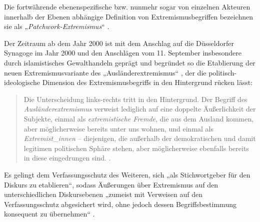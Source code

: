 Die fortwährende ebenenspezifische bzw. nunmehr sogar von einzelnen Akteuren innerhalb der Ebenen abhängige Definition von Extremismusbegriffen bezeichnen sie als „\emph{Patchwork-Extremismus}`` \autocite[191]{ackermannMetamorphosenExtremismusbegriffesDiskursanalytische2015}.

Der Zeitraum ab dem Jahr 2000 ist mit dem Anschlag auf die Düsseldorfer Synagoge im Jahr 2000 und den Anschlägen vom 11. September insbesondere durch islamistisches Gewalthandeln geprägt und begründet so die Etablierung der neuen Extremismusvariante des „Ausländerextremismus`` \autocite[210]{ackermannMetamorphosenExtremismusbegriffesDiskursanalytische2015}, der die politisch-ideologische Dimension des Extremismusbegriffs in den Hintergrund rücken lässt:

\begin{quote}
Die Unterscheidung links-rechts tritt in den Hintergrund. Der Begriff des \emph{Ausländerextremismus} verweist lediglich auf eine doppelte Äußerlichkeit der Subjekte, einmal als \emph{extremistische Fremde}, die aus dem Ausland kommen, aber möglicherweise bereits unter uns wohnen, und einmal als \emph{Extremist\_innen} -- diejenigen, die außerhalb der demokratischen und damit legitimen politischen Sphäre stehen, aber möglicherweise ebenfalls bereits in diese eingedrungen sind. \autocite[210-211]{ackermannMetamorphosenExtremismusbegriffesDiskursanalytische2015}.
\end{quote}

Es gelingt dem Verfassungsschutz des Weiteren, sich „als Stichwortgeber für den Diskurs zu etablieren``, sodass Äußerungen über Extremismus auf den unterschiedlichen Diskursebenen „zumeist mit Verweisen auf den Verfassungsschutz abgesichert wird, ohne jedoch dessen Begriffsbestimmung konsequent zu übernehmen`` \autocite[211]{ackermannMetamorphosenExtremismusbegriffesDiskursanalytische2015}.

